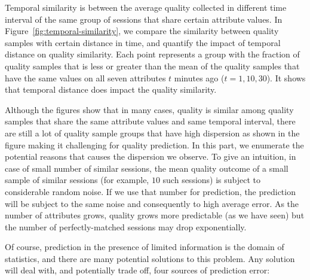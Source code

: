  Temporal similarity is between the average quality collected in different time interval of the same group of sessions that share certain attribute values. In Figure~\ref{fig:temporal-similarity}, we compare the similarity between quality samples with certain distance in time, and quantify the impact of temporal distance on quality similarity. Each point represents a group with the fraction of quality samples that is less or greater than the mean of the quality samples that have the same values on all seven attributes $t$ minutes ago ($t=1,10,30$). It shows that temporal distance does impact the quality similarity. 


Although the figures show that in many cases, quality is similar among quality samples that share the same attribute values and same temporal interval, there are still a lot of quality sample groups that have high dispersion as shown in the figure making it challenging for quality prediction. 
In this part, we enumerate the potential reasons that causes the dispersion we observe. To give an intuition, in case of small number of similar sessions, the mean quality outcome of a small sample of similar sessions (for example, $10$ such sessions) is subject to considerable random noise.  If we use that number for prediction, the prediction will be subject to the same noise and consequently to high average error.  As the number of attributes grows, quality grows more predictable (as we have seen) but the number of perfectly-matched sessions may drop exponentially.

Of course, prediction in the presence of limited information is the domain of statistics, and there are many potential solutions to this problem.  Any solution will deal with, and potentially trade off, four sources of prediction error:

